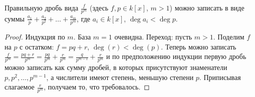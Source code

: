 \begin{lemma}\label{lem_proper_irreducible}
Правильную дробь вида $\frac{f}{p^m}$ (здесь $f,p\in k[x]$, $m>1$)
можно записать в виде суммы
$\frac{a_1}{p}+\frac{a_2}{p^2}+\dots+\frac{a_m}{p^m}$, где $a_i\in
k[x]$, $\deg{a_i}<\deg{p}$.
\end{lemma}
\begin{proof}
Индукция по $m$. База $m=1$ очевидна. Переход: пусть $m>1$. Поделим $f$
на $p$ с остатком: $f=pq+r$, $\deg(r)<\deg(p)$. Теперь можно записать
$\frac{f}{p^m}=\frac{pq+r}{p^m}=\frac{pq}{p^m}+\frac{r}{p^m}=\frac{q}{p^{m-1}}+\frac{r}{p^m}$
и по предположению индукции первую дробь можно записать как сумму
дробей, в которых присутствуют знаменатели $p, p^2,\dots,p^{m-1}$, а
числители имеют степень, меньшую степени $p$. Приписывая слагаемое
$\frac{r}{p^m}$, получаем то, что требовалось.
\end{proof}


